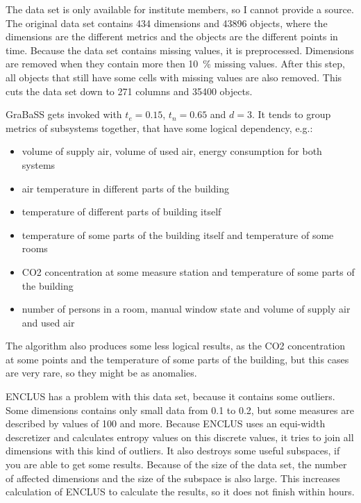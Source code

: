 The data set is only available for institute members, so I cannot provide a source. The original data set contains \num{434} dimensions and \num{43896} objects, where the dimensions are the different metrics and the objects are the different points in time. Because the data set contains missing values, it is preprocessed. Dimensions are removed when they contain more then \SI{10}{\percent} missing values. After this step, all objects that still have some cells with missing values are also removed. This cuts the data set down to \num{271} columns and \num{35400} objects.

GraBaSS gets invoked with $t_e = 0.15$, $t_n = 0.65$ and $d = 3$. It tends to group metrics of subsystems together, that have some logical dependency, e.g.:
\begin{itemize}
	\item volume of supply air, volume of used air, energy consumption for both systems
	\item air temperature in different parts of the building
	\item temperature of different parts of building itself
	\item temperature of some parts of the building itself and temperature of some rooms
	\item CO2 concentration at some measure station and temperature of some parts of the building
	\item number of persons in a room, manual window state and volume of supply air and used air
\end{itemize}

The algorithm also produces some less logical results, as the CO2 concentration at some points and the temperature of some parts of the building, but this cases are very rare, so they might be as anomalies.

ENCLUS has a problem with this data set, because it contains some outliers. Some dimensions contains only small data from \num{0.1} to \num{0.2}, but some measures are described by values of \num{100} and more. Because ENCLUS uses an equi-width descretizer and calculates entropy values on this discrete values, it tries to join all dimensions with this kind of outliers. It also destroys some useful subspaces, if you are able to get some results. Because of the size of the data set, the number of affected dimensions and the size of the subspace is also large. This increases calculation of ENCLUS to calculate the results, so it does not finish within hours.

